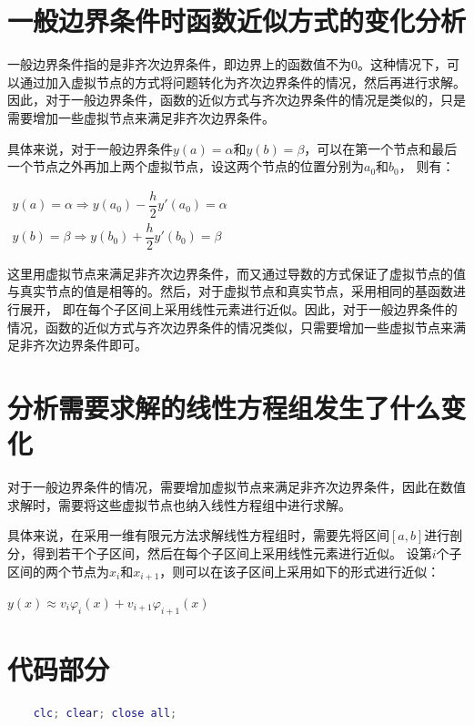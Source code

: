 \documentclass[12pt, a4paper, oneside]{ctexart}
\begin{document}
\begin{spacing}{2.0}
\section{一般边界条件时函数近似方式的变化分析}
一般边界条件指的是非齐次边界条件，即边界上的函数值不为0。这种情况下，可以通过加入虚拟节点的方式将问题转化为齐次边界条件的情况，然后再进行求解。
因此，对于一般边界条件，函数的近似方式与齐次边界条件的情况是类似的，只是需要增加一些虚拟节点来满足非齐次边界条件。

具体来说，对于一般边界条件$y(a)=\alpha$和$y(b)=\beta$，可以在第一个节点和最后一个节点之外再加上两个虚拟节点，设这两个节点的位置分别为$a_0$和$b_0$，
则有：
\begin{center}
    $\begin{array}{c}y(a)=\alpha\Rightarrow y(a_0)-\dfrac{h}{2}y'(a_0)=\alpha\\ 
    y(b)=\beta\Rightarrow y(b_0)+\dfrac{h}{2}y'(b_0)=\beta\end{array}$
\end{center}
这里用虚拟节点来满足非齐次边界条件，而又通过导数的方式保证了虚拟节点的值与真实节点的值是相等的。然后，对于虚拟节点和真实节点，采用相同的基函数进行展开，
即在每个子区间上采用线性元素进行近似。因此，对于一般边界条件的情况，函数的近似方式与齐次边界条件的情况类似，只需要增加一些虚拟节点来满足非齐次边界条件即可。

\section{分析需要求解的线性方程组发生了什么变化}
对于一般边界条件的情况，需要增加虚拟节点来满足非齐次边界条件，因此在数值求解时，需要将这些虚拟节点也纳入线性方程组中进行求解。

具体来说，在采用一维有限元方法求解线性方程组时，需要先将区间$[a,b]$进行剖分，得到若干个子区间，然后在每个子区间上采用线性元素进行近似。
设第$i$个子区间的两个节点为$x_i$和$x_{i+1}$，则可以在该子区间上采用如下的形式进行近似：

\begin{center}
    $y(x)\approx v_i\varphi_i(x)+v_{i+1}\varphi_{i+1}(x)\quad\text{}$
\end{center}

\section{代码部分}
\begin{lstlisting}[language=MATLAB, caption=有限元]
    % 一维有限元方法求解常微分方程边值问题
    clc; clear; close all;
    

\end{lstlisting}
\end{spacing}
\end{document}
